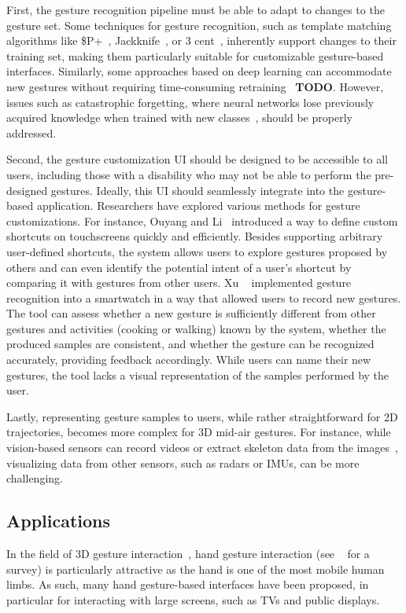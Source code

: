 First, the gesture recognition pipeline must be able to adapt to changes to the gesture set. 
Some techniques for gesture recognition, such as template matching algorithms like \$P+~\cite{Vatavu:2017a}, Jackknife~\cite{Taranta:2017}, or 3 cent~\cite{Caputo:2017}, inherently support changes to their training set, making them particularly suitable for customizable gesture-based interfaces. Similarly, some approaches based on deep learning can accommodate new gestures without requiring time-consuming retraining~\cite{TODO} \textbf{TODO}. However, issues such as catastrophic forgetting, where neural networks lose previously acquired knowledge when trained with new classes~\cite{Schak:2019, Li:2022}, should be properly addressed.

Second, the gesture customization UI should be designed to be accessible to all users, including those with a disability who may not be able to perform the pre-designed gestures. Ideally, this UI should seamlessly integrate into the gesture-based application.
%
Researchers have explored various methods for gesture customizations.
%
For instance, Ouyang and Li~\cite{Ouyang:2012} introduced a way to define custom shortcuts on touchscreens quickly and efficiently. Besides supporting arbitrary user-defined shortcuts, the system allows users to explore gestures proposed by others and can even identify the potential intent of a user's shortcut by comparing it with gestures from other users.
%
Xu \etal~\cite{Xu:2022} implemented gesture recognition into a smartwatch in a way that allowed users to record new gestures. The tool can assess whether a new gesture is sufficiently different from other gestures and activities (\eg cooking or walking) known by the system, whether the produced samples are consistent, and whether the gesture can be recognized accurately, providing feedback accordingly. While users can name their new gestures, the tool lacks a visual representation of the samples performed by the user.

Lastly, representing gesture samples to users, while rather straightforward for 2D trajectories, becomes more complex for 3D mid-air gestures. For instance, while vision-based sensors can record videos or extract skeleton data from the images~\cite{DeSmedt:2017,Li:2017b}, visualizing data from other sensors, such as radars or IMUs, can be more challenging.


\subsection{Applications} \label{sec:state_of_the_art:overview:applications}
In the field of 3D gesture interaction~\cite{LaViola:2013,Koutsabasis:2019}, hand gesture interaction (see ~\cite{Cheng:2016} for a survey) is particularly attractive as the hand is one of the most mobile human limbs. As such, many hand gesture-based interfaces have been proposed, in particular for interacting with large screens, such as TVs and public displays.

